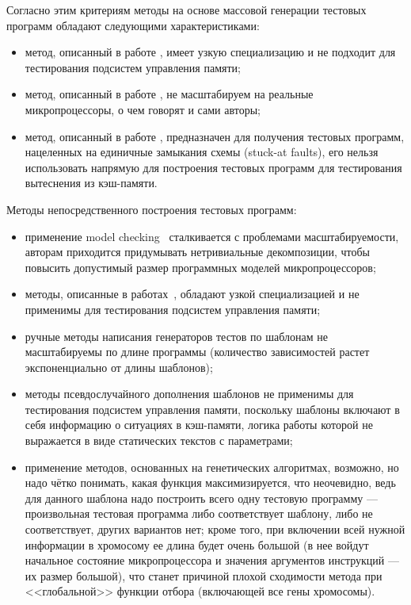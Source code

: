 Согласно этим критериям методы на основе массовой генерации тестовых программ обладают следующими характеристиками:
\begin{itemize}
  \item метод, описанный в работе \cite{Berkeley89}, имеет узкую специализацию и не подходит для тестирования подсистем управления памяти;
  \item метод, описанный в работе \cite{MishraDutt02}, не масштабируем на реальные микропроцессоры, о чем говорят и сами авторы;
  \item метод, описанный в работе \cite{microGP}, предназначен для получения тестовых программ, нацеленных на единичные замыкания схемы (stuck-at faults), его нельзя использовать напрямую для построения тестовых программ для тестирования вытеснения из кэш-памяти.
\end{itemize}

Методы непосредственного построения тестовых программ:
\begin{itemize}
  \item применение model checking~\cite{MishraDutt04} сталкивается с проблемами масштабируемости, авторам приходится придумывать нетривиальные декомпозиции, чтобы повысить допустимый размер программных моделей микропроцессоров;
  \item методы, описанные в работах~\cite{MishraDutt05, Branches99}, обладают узкой специализацией и не применимы для тестирования подсистем управления памяти;
  \item ручные методы написания генераторов тестов по шаблонам не масштабируемы по длине программы (количество зависимостей растет экспоненциально от длины шаблонов);
  \item методы псевдослучайного дополнения шаблонов не применимы для тестирования подсистем управления памяти, поскольку шаблоны включают в себя информацию о ситуациях в кэш-памяти, логика работы которой  не выражается в виде статических текстов с параметрами;
  \item применение методов, основанных на генетических алгоритмах, возможно, но надо чётко понимать, какая функция максимизируется, что неочевидно, ведь для данного шаблона надо построить всего одну тестовую программу --- произвольная тестовая программа либо соответствует шаблону, либо не соответствует, других вариантов нет; кроме того, при включении всей нужной информации в хромосому ее длина будет очень большой (в нее войдут начальное состояние микропроцессора и значения аргументов  инструкций --- их размер большой), что станет причиной плохой сходимости метода при <<глобальной>> функции отбора (включающей все гены хромосомы).
\end{itemize}


